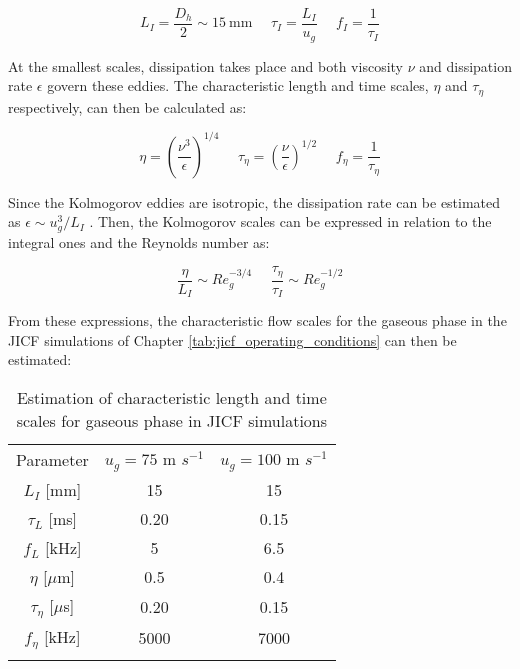 	\begin{equation}
	L_I = \frac{D_h}{2} \sim 15 ~ \mathrm{mm}  ~~~~~~ \tau_I = \frac{L_I}{u_g} ~~~~~~ f_I = \frac{1}{\tau_I}
	\end{equation}
	
At the smallest scales, dissipation takes place and both viscosity $\nu$ and dissipation rate $\epsilon$ govern these eddies. The characteristic length and time scales, $\eta$ and $\tau_\eta$ respectively, can then be calculated as:

\begin{equation}
\eta = \left( \frac{\nu^3}{\epsilon} \right)^{1/4} ~~~~~~ \tau_\eta = \left( \frac{\nu}{\epsilon} \right)^{1/2} ~~~~~~ f_\eta = \frac{1}{\tau_\eta}
\end{equation}

Since the Kolmogorov eddies are isotropic, the dissipation rate can be estimated as $\epsilon \sim u_g^3/L_I$ . Then, the Kolmogorov scales can be expressed in relation to the integral ones and the Reynolds number as:

\begin{equation}
\frac{\eta}{L_I} \sim Re_g^{-3/4} ~~~~~~ \frac{\tau_\eta}{\tau_I} \sim Re_g^{-1/2}
\end{equation}

From these expressions, the characteristic flow scales for the gaseous phase in the JICF simulations of Chapter \ref{tab:jicf_operating_conditions} can then be estimated:

\begin{table}[!h]
\centering
\caption{Estimation of characteristic length and time scales for gaseous phase in JICF simulations}
\begin{tabular}{ccc}
\thickhline
Parameter &  $u_g = 75$ m $s^{-1}$ &  $u_g = 100$ m $s^{-1}$ \\ 
\thickhline
$L_I$ [mm] & 15 & 15 \\
$\tau_L$ [ms] & 0.20 & 0.15 \\
$f_L$ [kHz] & 5 & 6.5 \\
\thickhline
$\eta$ [$\mu$m] & 0.5 & 0.4 \\
$\tau_\eta$ [$\mu$s] & 0.20 & 0.15 \\
$f_\eta$ [kHz] & 5000 & 7000 \\
\thickhline
\end{tabular}
\label{tab:jicf_velocity_profiles_parameters}
\end{table}